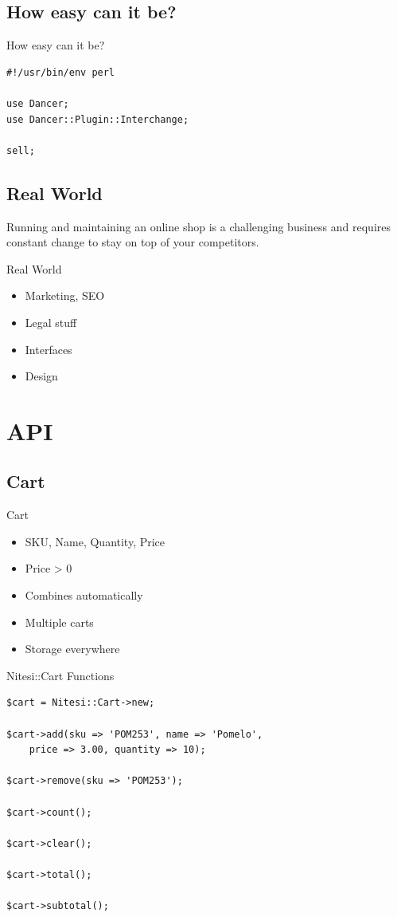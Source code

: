 \subsection{How easy can it be?}
\begin{frame}[fragile]{How easy can it be?}
\begin{lstlisting}
#!/usr/bin/env perl

use Dancer;
use Dancer::Plugin::Interchange;

sell;
\end{lstlisting}
\end{frame}

\subsection{Real World}
Running and maintaining an online shop is a challenging business
and requires constant change to stay on top of your competitors.

\begin{frame}{Real World}
\begin{itemize}
\item Marketing, SEO
\item Legal stuff
\item Interfaces
\item Design
\end{itemize}
\end{frame}

\section{API}
\subsection{Cart}
\begin{frame}{Cart}
\begin{itemize}
\item SKU, Name, Quantity, Price
\item Price > 0
\item Combines automatically
\item Multiple carts
\item Storage everywhere
\end{itemize}
\end{frame}

\begin{frame}[fragile]{Nitesi::Cart Functions}
\begin{lstlisting}
$cart = Nitesi::Cart->new;

$cart->add(sku => 'POM253', name => 'Pomelo',
    price => 3.00, quantity => 10);

$cart->remove(sku => 'POM253');

$cart->count();

$cart->clear();

$cart->total();

$cart->subtotal();
\end{lstlisting}
\end{frame}

